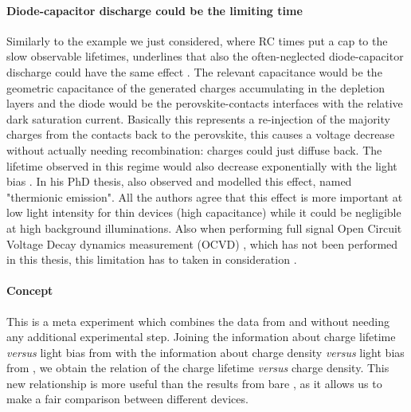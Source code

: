 		\paragraph{Diode\hyp{}capacitor discharge could be the limiting time}
		Similarly to the example we just considered, where RC times put a cap to the slow observable lifetimes,  underlines that also the often-neglected diode\hyp{}capacitor discharge could have the same effect \cite{Tvingstedt2017,Hellen2003}.
		The relevant capacitance would be the geometric capacitance of the generated charges accumulating in the depletion layers and the diode would be the perovskite-contacts interfaces with the relative dark saturation current.
		Basically this represents a re\hyp{}injection of the majority charges from the contacts back to the perovskite, this causes a voltage decrease without actually needing recombination: charges could just diffuse back.
				The lifetime observed in this regime would also decrease exponentially with the light bias \cite{Castaner1981}.
				In his PhD thesis, also  observed and modelled this effect, named "thermionic emission".
				All the authors agree that this effect is more important at low light intensity for thin devices (high capacitance) \cite{Kiermasch2018} while it could be negligible at high background illuminations.
		Also when performing full signal Open Circuit Voltage Decay dynamics measurement (OCVD) \cite{Lederhandler1955,Mahan1981}, which has not been performed in this thesis, this limitation has to taken in consideration \cite{Tvingstedt2017,Pockett2017,Pockett2015,Kiermasch2018}.

		\FloatBarrier
		\newpage
		\label{characterization_tpvce}

		\paragraph{Concept}
		This is a meta experiment which combines the data from  and  without needing any additional experimental step.
		Joining the information about charge lifetime \textsl{versus} light bias from  with the information about charge density \textsl{versus} light bias from , we obtain the relation of the charge lifetime \textsl{versus} charge density.
		This new relationship is more useful than the results from bare , as it allows us to make a fair comparison between different devices.

